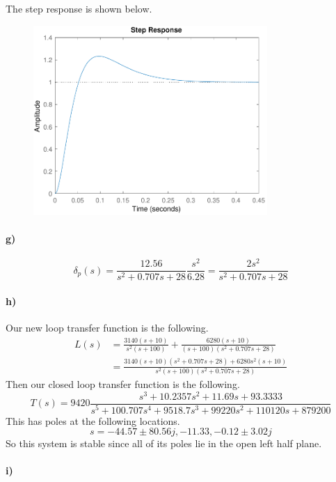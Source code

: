 \documentclass[12pt]{article}
\begin{document}
The step response is shown below.
\begin{figure}[H]
    \begin{center}
        \includegraphics[width=3.5in]{problem5f.pdf}
    \end{center}
\end{figure}

\paragraph{g)}

\[\delta_p(s)=\frac{12.56}{s^2+0.707s+28}\frac{s^2}{6.28}=\frac{2s^2}{s^2+0.707s+28}\]

\paragraph{h)}

Our new loop transfer function is the following.
\begin{align*}
    L(s)&=\frac{3140(s+10)}{s^2(s+100)}+\frac{6280(s+10)}{(s+100)(s^2+0.707s+28)}\\
    &=\frac{3140(s+10)(s^2+0.707s+28)+6280s^2(s+10)}{s^2(s+100)(s^2+0.707s+28)}
\end{align*}
Then our closed loop transfer function is the following.
\[T(s)=9420\frac{s^3+10.2357s^2+11.69s+93.3333}{s^5+100.707s^4+9518.7s^3+99220s^2+110120s+879200}\]
This has poles at the following locations.
\[s=-44.57 \pm 80.56j,-11.33,-0.12 \pm 3.02j\]
So this system is stable since all of its poles lie in the open left half plane.

\paragraph{i)}
\end{document}
